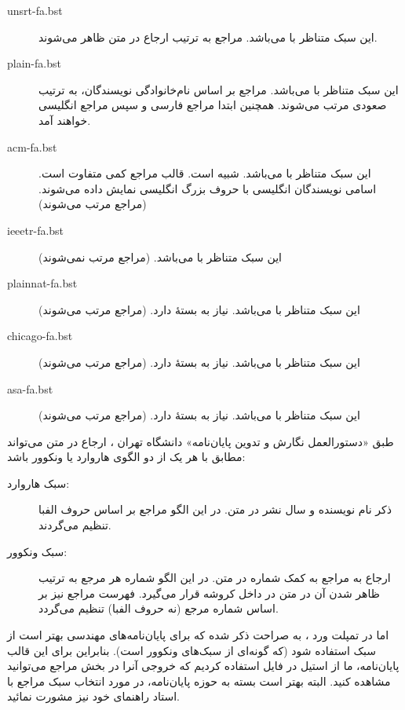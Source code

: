\singlespacing
\begin{description}
\item [unsrt-fa.bst] این سبک متناظر با  می‌باشد. مراجع به ترتیب ارجاع در متن ظاهر می‌شوند.
\item [plain-fa.bst] این سبک متناظر با  می‌باشد. مراجع بر اساس نام‌خانوادگی نویسندگان، به ترتیب صعودی مرتب می‌شوند.
 همچنین ابتدا مراجع فارسی و سپس مراجع انگلیسی خواهند آمد.
\item [acm-fa.bst] این سبک متناظر با  می‌باشد. شبیه  است.  قالب مراجع کمی متفاوت است. اسامی نویسندگان انگلیسی با حروف بزرگ انگلیسی نمایش داده می‌شوند. (مراجع مرتب می‌شوند)
\item [ieeetr-fa.bst] این سبک متناظر با  می‌باشد. (مراجع مرتب نمی‌شوند)
\item [plainnat-fa.bst] این سبک متناظر با  می‌باشد. نیاز به بستهٔ  دارد. (مراجع مرتب می‌شوند)
\item [chicago-fa.bst] این سبک متناظر با  می‌باشد. نیاز به بستهٔ  دارد. (مراجع مرتب می‌شوند)
\item [asa-fa.bst] این سبک متناظر با  می‌باشد. نیاز به بستهٔ  دارد. (مراجع مرتب می‌شوند)
\end{description}
\doublespacing

طبق «دستورالعمل نگارش و تدوین پایان‌نامه» دانشگاه تهران
\cite{UTThesisGuide}،
ارجاع در متن می‌تواند مطابق با هر یک از دو الگوی هاروارد یا ونکوور باشد:
\singlespacing
\begin{description}
	\item[سبک هاروارد:]
	ذکر نام نویسنده و سال نشر در متن. در این الگو مراجع بر اساس حروف الفبا تنظیم می‌گردند.
	\item[سبک ونکوور:]
	ارجاع به مراجع به کمک شماره در متن. در این الگو شماره هر مرجع به ترتیب ظاهر شدن آن در متن در داخل کروشه قرار می‌گیرد. فهرست مراجع نیز بر اساس شماره مرجع (نه حروف الفبا) تنظیم می‌گردد.
\end{description}
\doublespacing
اما در تمپلت ورد
\cite{UTThesisGuide}،
به صراحت ذکر شده که برای پایان‌نامه‌های مهندسی بهتر است از سبک 
استفاده شود (که گونه‌ای از سبک‌های ونکوور است).
بنابراین برای این قالب پایان‌نامه، ما از استیل
در فایل
استفاده کردیم که خروجی آنرا در بخش مراجع می‌توانید مشاهده کنید. البته بهتر است بسته به حوزه پایان‌نامه، در مورد انتخاب سبک مراجع با استاد راهنمای خود نیز مشورت نمائید.

